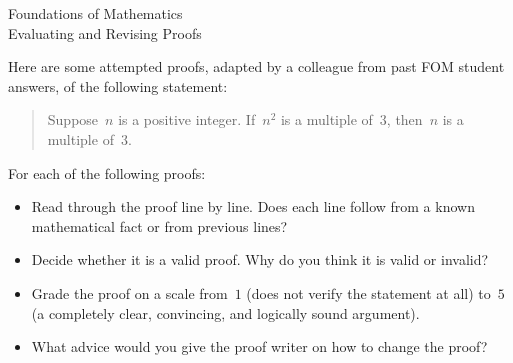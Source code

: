 \documentclass[12pt,letterpaper]{report}
\begin{document}
\begin{center}
Foundations of Mathematics \\
Evaluating and Revising Proofs\\
\end{center}

Here are some attempted proofs, adapted by a colleague from past FOM student answers, of the following statement:
\begin{quote}
Suppose~$n$ is a positive integer.  If~$n^2$ is a multiple of~$3$, then~$n$ is a multiple of~$3$.
\end{quote} 

For each of the following proofs:
\begin{itemize}
\item  Read through the proof line by line.  Does each line follow from a known mathematical fact or from previous lines?
\item  Decide whether it is a valid proof.  Why do you think it is valid or invalid?
\item  Grade the proof on a scale from~$1$ (does not verify the statement at all) to~$5$ (a completely clear, convincing, and logically sound argument).
\item  What advice would you give the proof writer on how to change the proof?
\end{itemize}

\bigskip
\end{document}

